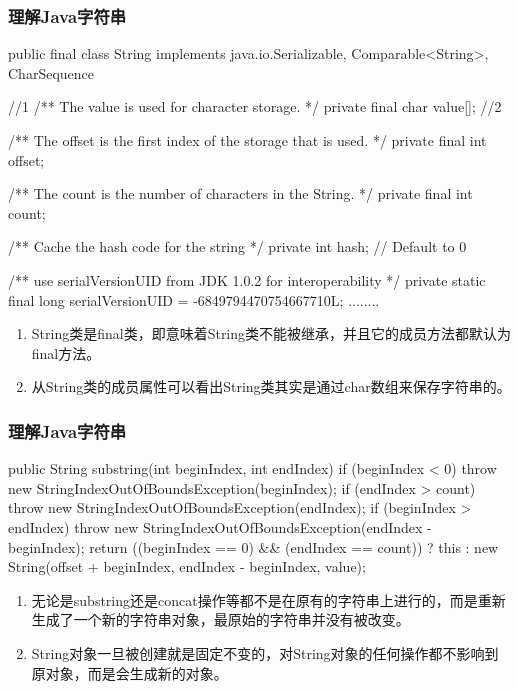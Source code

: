 \begin{frame}[fragile]
  \frametitle{理解Java字符串}

  \begin{javaCode}
    public final class String
    implements java.io.Serializable, Comparable<String>, CharSequence { //1
    /** The value is used for character storage. */
    private final char value[]; //2

    /** The offset is the first index of the storage that is used. */
    private final int offset;

    /** The count is the number of characters in the String. */
    private final int count;

    /** Cache the hash code for the string */
    private int hash; // Default to 0

    /** use serialVersionUID from JDK 1.0.2 for interoperability */
    private static final long serialVersionUID = -6849794470754667710L;
    ........
}
  \end{javaCode}

  \begin{enumerate}\kai\small
  \item String类是final类，即意味着String类不能被继承，并且它的成员方法都默认为final方法。
  \item 从String类的成员属性可以看出String类其实是通过char数组来保存字符串的。
  \end{enumerate}
\end{frame}


\begin{frame}[fragile]
  \frametitle{理解Java字符串}

  \begin{javaCode}
    public String substring(int beginIndex, int endIndex) {
      if (beginIndex < 0) {
        throw new StringIndexOutOfBoundsException(beginIndex);
      }
      if (endIndex > count) {
        throw new StringIndexOutOfBoundsException(endIndex);
      }
      if (beginIndex > endIndex) {
        throw new StringIndexOutOfBoundsException(endIndex - beginIndex);
      }
      return ((beginIndex == 0) && (endIndex == count)) ? this :
      new String(offset + beginIndex, endIndex - beginIndex, value);
    }
  \end{javaCode}

  \begin{enumerate}\kai\small
  \item 无论是substring还是concat操作等都不是在原有的字符串上进行的，而是重新生成了一个新的字符串对象，最原始的字符串并没有被改变。
  \item {\hei\Red String对象一旦被创建就是固定不变的，对String对象的任何操作都不影响到原对象，而是会生成新的对象。}
  \end{enumerate}
\end{frame}

